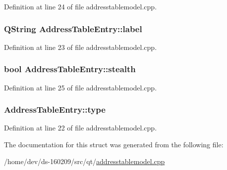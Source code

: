 Definition at line 24 of file addresstablemodel.\+cpp.

\hypertarget{struct_address_table_entry_a4a427495652b7716f84aa88b2cb4f296}{}
\subsubsection[{label}]{\setlength{\rightskip}{0pt plus 5cm}Q\+String Address\+Table\+Entry\+::label}\label{struct_address_table_entry_a4a427495652b7716f84aa88b2cb4f296}


Definition at line 23 of file addresstablemodel.\+cpp.

\hypertarget{struct_address_table_entry_a8c0c9270d5fbe170c712d4e0fa9b5d06}{}
\subsubsection[{stealth}]{\setlength{\rightskip}{0pt plus 5cm}bool Address\+Table\+Entry\+::stealth}\label{struct_address_table_entry_a8c0c9270d5fbe170c712d4e0fa9b5d06}


Definition at line 25 of file addresstablemodel.\+cpp.

\hypertarget{struct_address_table_entry_a2e782e5239a5adae62eaa81746f55314}{}
\subsubsection[{type}]{ Address\+Table\+Entry\+::type}\label{struct_address_table_entry_a2e782e5239a5adae62eaa81746f55314}


Definition at line 22 of file addresstablemodel.\+cpp.



The documentation for this struct was generated from the following file\+:\begin{DoxyCompactItemize}
\item 
/home/dev/ds-\/160209/src/qt/\hyperlink{addresstablemodel_8cpp}{addresstablemodel.\+cpp}\end{DoxyCompactItemize}

